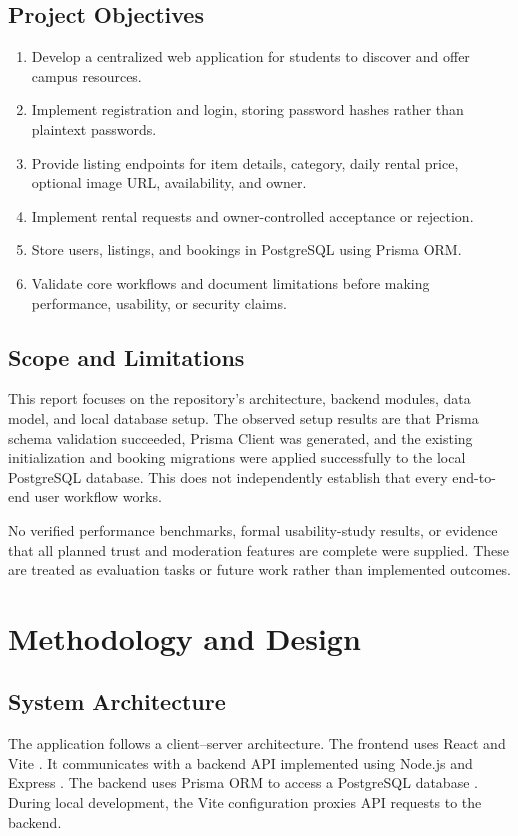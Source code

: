 \documentclass{tietreport}
\begin{document}
\section{Project Objectives}
\begin{enumerate}[label=\arabic*.]
  \item Develop a centralized web application for students to discover and offer campus resources.
  \item Implement registration and login, storing password hashes rather than plaintext passwords.
  \item Provide listing endpoints for item details, category, daily rental price, optional image URL, availability, and owner.
  \item Implement rental requests and owner-controlled acceptance or rejection.
  \item Store users, listings, and bookings in PostgreSQL using Prisma ORM.
  \item Validate core workflows and document limitations before making performance, usability, or security claims.
\end{enumerate}

\section{Scope and Limitations}
This report focuses on the repository's architecture, backend modules, data model, and local database setup. The observed setup results are that Prisma schema validation succeeded, Prisma Client was generated, and the existing initialization and booking migrations were applied successfully to the local PostgreSQL database. This does not independently establish that every end-to-end user workflow works.

No verified performance benchmarks, formal usability-study results, or evidence that all planned trust and moderation features are complete were supplied. These are treated as evaluation tasks or future work rather than implemented outcomes.

\chapter{Methodology and Design}
\section{System Architecture}
The application follows a client--server architecture. The frontend uses React and Vite \cite{reactdocs,vitedocs}. It communicates with a backend API implemented using Node.js and Express \cite{expressdocs}. The backend uses Prisma ORM to access a PostgreSQL database \cite{prismadocs,postgresdocs}. During local development, the Vite configuration proxies API requests to the backend.
\end{document}
